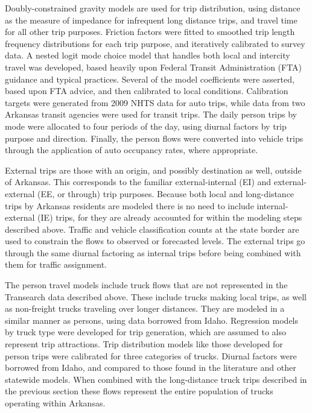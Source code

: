 Doubly-constrained gravity models are used for trip distribution, using distance as the measure of impedance for infrequent long distance trips, and travel time for all other trip purposes. Friction factors were fitted to smoothed trip length frequency distributions for each trip purpose, and iteratively calibrated to survey data. A nested logit mode choice model that handles both local and intercity travel was developed, based heavily upon Federal Transit Administration (FTA) guidance and typical practices. Several of the model coefficients were asserted, based upon FTA advice, and then calibrated to local conditions. Calibration targets were generated from 2009 NHTS data for auto trips, while data from two Arkansas transit agencies were used for transit trips. The daily person trips by mode were allocated to four periods of the day, using diurnal factors by trip purpose and direction. Finally, the person flows were converted into vehicle trips through the application of auto occupancy rates, where appropriate.

External trips are those with an origin, and possibly destination as well, outside of Arkansas. This corresponds to the familiar external-internal (EI) and external-external (EE, or through) trip purposes. Because both local and long-distance trips by Arkansas residents are modeled there is no need to include internal-external (IE) trips, for they are already accounted for within the modeling steps described above. Traffic and vehicle classification counts at the state border are used to constrain the flows to observed or forecasted levels. The external trips go through the same diurnal factoring as internal trips before being combined with them for traffic assignment.

The person travel models include truck flows that are not represented in the Transearch data described above. These include trucks making local trips, as well as non-freight trucks traveling over longer distances. They are modeled in a similar manner as persons, using data borrowed from Idaho. Regression models by truck type were developed for trip generation, which are assumed to also represent trip attractions. Trip distribution models like those developed for person trips were calibrated for three categories of trucks. Diurnal factors were borrowed from Idaho, and compared to those found in the literature and other statewide models. When combined with the long-distance truck trips described in the previous section these flows represent the entire population of trucks operating within Arkansas.

